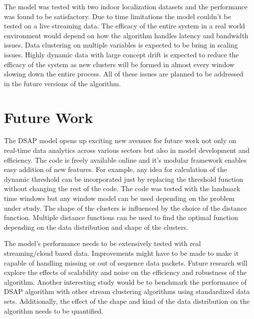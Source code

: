 The model was tested with two indoor localization datasets and the performance was found to be satisfactory. Due to time limitations the model couldn't be tested on a live streaming data. The efficacy of the entire system in a real world environment would depend on how the algorithm handles latency and bandwidth issues. Data clustering on multiple variables is expected to be bring in scaling issues. Highly dynamic data with large concept drift is expected to reduce the efficacy of the system as new clusters will be formed in almost every window slowing down the entire process. All of these issues are planned to be addressed in the future versions of the algorithm.




\section{Future Work}

The DSAP model opens up exciting new avenues for future work not only on real-time data analytics across various sectors but also in model development and efficiency. The code is freely available online and it's modular framework enables easy addition of new features. For example, any idea for calculation of the dynamic threshold can be incorporated just by replacing the threshold function without changing the rest of the code. The code was tested with the landmark time windows but any window model can be used depending on the problem under study. The shape of the clusters is influenced by the choice of the distance function. Multiple distance functions can be used to find the optimal function depending on the data distribution and shape of the clusters.

The model's performance needs to be extensively tested with real streaming/cloud based data. Improvements might have to be made to make it capable of handling missing or out of sequence data packets. Future research will explore the effects of scalability and noise on the efficiency and robustness of the algorithm. Another interesting study would be to benchmark the performance of DSAP algorithm with other stream clustering algorithms using standardized data sets. Additionally, the effect of the shape and kind of the data distribution on the algorithm needs to be quantified.

